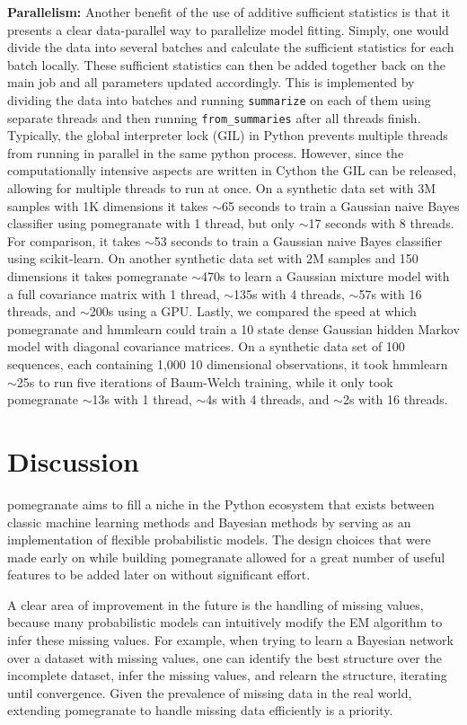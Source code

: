 \documentclass{article}
\newcommand{\code}[1]{\colorbox{light-gray}{\texttt{#1}}}
\begin{document}
\vspace{1em}\noindent\textbf{Parallelism:} Another benefit of the use of additive sufficient statistics is that it presents a clear data-parallel way to parallelize model fitting. Simply, one would divide the data into several batches and calculate the sufficient statistics for each batch locally. These sufficient statistics can then be added together back on the main job and all parameters updated accordingly. This is implemented by dividing the data into batches and running \code{summarize} on each of them using separate threads and then running \code{from\_summaries} after all threads finish. Typically, the global interpreter lock (GIL) in Python prevents multiple threads from running in parallel in the same python process. However, since the computationally intensive aspects are written in Cython the GIL can be released, allowing for multiple threads to run at once. On a synthetic data set with 3M samples with 1K dimensions it takes $\sim$65 seconds to train a Gaussian naive Bayes classifier using pomegranate with 1 thread, but only $\sim$17 seconds with 8 threads. For comparison, it takes $\sim$53 seconds to train a Gaussian naive Bayes classifier using scikit-learn. On another synthetic data set with 2M samples and 150 dimensions it takes pomegranate $\sim$470s to learn a Gaussian mixture model with a full covariance matrix with 1 thread, $\sim$135s with 4 threads, $\sim$57s with 16 threads, and $\sim$200s using a GPU. Lastly, we compared the speed at which pomegranate and hmmlearn could train a 10 state dense Gaussian hidden Markov model with diagonal covariance matrices. On a synthetic data set of 100 sequences, each containing 1,000 10 dimensional observations, it took hmmlearn $\sim$25s to run five iterations of Baum-Welch training, while it only took pomegranate $\sim$13s with 1 thread, $\sim$4s with 4 threads, and $\sim$2s with 16 threads.  

\section{Discussion}
pomegranate aims to fill a niche in the Python ecosystem that exists between classic machine learning methods and Bayesian methods by serving as an implementation of flexible probabilistic models. The design choices that were made early on while building pomegranate allowed for a great number of useful features to be added later on without significant effort.

A clear area of improvement in the future is the handling of missing values, because many probabilistic models can intuitively modify the EM algorithm to infer these missing values. For example, when trying to learn a Bayesian network over a dataset with missing values, one can identify the best structure over the incomplete dataset, infer the missing values, and relearn the structure, iterating until convergence. Given the prevalence of missing data in the real world, extending pomegranate to handle missing data efficiently is a priority.
\end{document}
